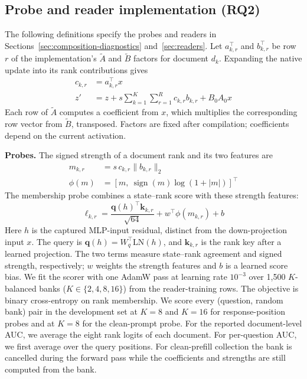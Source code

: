 \subsection{Probe and reader implementation (RQ2)}
\label{sec:rank-gates}
The following definitions specify the probes and readers in
Sections~\ref{sec:composition-diagnostics} and~\ref{sec:readers}.
Let $a_{k,r}^{\top}$ and $b_{k,r}^{\top}$ be row $r$ of the implementation's
$\widetilde A$ and $\widetilde B$ factors for document
$d_k$. Expanding the native update into its rank contributions gives
\begin{equation}
\begin{aligned}
c_{k,r}&=a_{k,r}^{\top}x\\
z'&=z+s\sum_{k=1}^{K}\sum_{r=1}^{R}c_{k,r}b_{k,r}+B_0A_0x
\end{aligned}
\label{eq:rank-bank}
\end{equation}
Each row of $\widetilde A$ computes a coefficient from $x$, which multiplies the
corresponding row vector from $\widetilde B$, transposed. Factors are fixed after compilation;
coefficients depend on the current activation.

\textbf{Probes.} The signed strength of a document rank and its two features are
\begin{equation}
\begin{aligned}
m_{k,r}&=s\,c_{k,r}\lVert b_{k,r}\rVert_2\\
\phi(m)&=[m,\ \operatorname{sign}(m)\log(1+|m|)]^{\top}
\end{aligned}
\label{eq:strength-features}
\end{equation}
The membership probe combines a state--rank score with these strength features:
\begin{equation}
\ell_{k,r}=
\frac{\mathbf q(h)^{\top}\mathbf k_{k,r}}{\sqrt{64}}
+w^{\top}\phi(m_{k,r})+b
\label{eq:probe-score}
\end{equation}
Here $h$ is the captured MLP-input residual, distinct from the down-projection
input $x$. The query is $\mathbf q(h)=W_q^{\top}\mathrm{LN}(h)$,
and $\mathbf k_{k,r}$ is the rank key after a learned projection. The two
terms measure state--rank agreement and signed strength, respectively;
$w$ weights the strength features and $b$ is a learned score bias.
We fit the scorer with one AdamW pass at learning rate $10^{-3}$ over 1,500
$K$-balanced banks ($K\in\{2,4,8,16\}$) from the reader-training rows. The objective
is binary cross-entropy on rank membership. We score every (question, random bank)
pair in the development set at $K=8$ and $K=16$ for response-position
probes and at $K=8$ for the clean-prompt probe.
For the reported document-level AUC, we average
the eight rank logits of each document. For per-question AUC, we first average over
the query positions. For
clean-prefill collection the bank is cancelled during the forward pass while the
coefficients and strengths are still computed from the bank.

